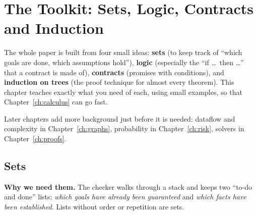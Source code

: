\section{The Toolkit: Sets, Logic, Contracts and Induction}
\label{ch:toolkit}

\begin{bigidea}
The whole paper is built from four small ideas: \textbf{sets} (to keep track of ``which goals are done, which assumptions hold''), \textbf{logic} (especially the ``if \dots\ then \dots'' that a contract is made of), \textbf{contracts} (promises with conditions), and \textbf{induction on trees} (the proof technique for almost every theorem). This chapter teaches exactly what you need of each, using small examples, so that Chapter~\ref{ch:calculus} can go fast.
\end{bigidea}

Later chapters add more background just before it is needed: dataflow and complexity in Chapter~\ref{ch:graphs}, probability in Chapter~\ref{ch:risk}, solvers in Chapter~\ref{ch:proofs}.

\subsection{Sets}

\textbf{Why we need them.} The checker walks through a stack and keeps two ``to-do and done'' lists: \emph{which goals have already been guaranteed} and \emph{which facts have been established}. Lists without order or repetition are sets.

